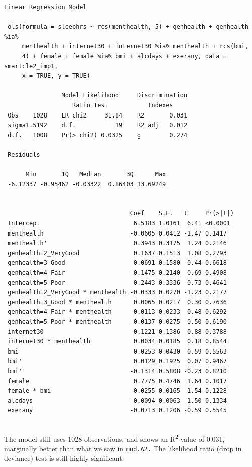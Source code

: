 \documentclass[]{book}
\theoremstyle{definition}
\theoremstyle{definition}
\theoremstyle{definition}
\theoremstyle{remark}
\begin{document}
\begin{verbatim}
Linear Regression Model
 
 ols(formula = sleephrs ~ rcs(menthealth, 5) + genhealth + genhealth %ia% 
     menthealth + internet30 + internet30 %ia% menthealth + rcs(bmi, 
     4) + female + female %ia% bmi + alcdays + exerany, data = smartcle2_imp1, 
     x = TRUE, y = TRUE)
 
                Model Likelihood     Discrimination    
                   Ratio Test           Indexes        
 Obs    1028    LR chi2     31.84    R2       0.031    
 sigma1.5192    d.f.           19    R2 adj   0.012    
 d.f.   1008    Pr(> chi2) 0.0325    g        0.274    
 
 Residuals
 
      Min       1Q   Median       3Q      Max 
 -6.12337 -0.95462 -0.03322  0.86403 13.69249 
 
 
                                   Coef    S.E.   t     Pr(>|t|)
 Intercept                          6.5183 1.0161  6.41 <0.0001 
 menthealth                        -0.0605 0.0412 -1.47 0.1417  
 menthealth'                        0.3943 0.3175  1.24 0.2146  
 genhealth=2_VeryGood               0.1637 0.1513  1.08 0.2793  
 genhealth=3_Good                   0.0691 0.1580  0.44 0.6618  
 genhealth=4_Fair                  -0.1475 0.2140 -0.69 0.4908  
 genhealth=5_Poor                   0.2443 0.3336  0.73 0.4641  
 genhealth=2_VeryGood * menthealth -0.0333 0.0270 -1.23 0.2177  
 genhealth=3_Good * menthealth      0.0065 0.0217  0.30 0.7636  
 genhealth=4_Fair * menthealth     -0.0113 0.0233 -0.48 0.6292  
 genhealth=5_Poor * menthealth     -0.0137 0.0275 -0.50 0.6190  
 internet30                        -0.1221 0.1386 -0.88 0.3788  
 internet30 * menthealth            0.0034 0.0185  0.18 0.8544  
 bmi                                0.0253 0.0430  0.59 0.5563  
 bmi'                               0.0129 0.1925  0.07 0.9467  
 bmi''                             -0.1314 0.5808 -0.23 0.8210  
 female                             0.7775 0.4746  1.64 0.1017  
 female * bmi                      -0.0255 0.0165 -1.54 0.1228  
 alcdays                           -0.0094 0.0063 -1.50 0.1334  
 exerany                           -0.0713 0.1206 -0.59 0.5545  
 
\end{verbatim}

The model still uses 1028 observations, and shows an
R\textsuperscript{2} value of 0.031, marginally better than what we saw
in \texttt{mod.A2.} The likelihood ratio (drop in deviance) test is
still highly significant.
\end{document}
